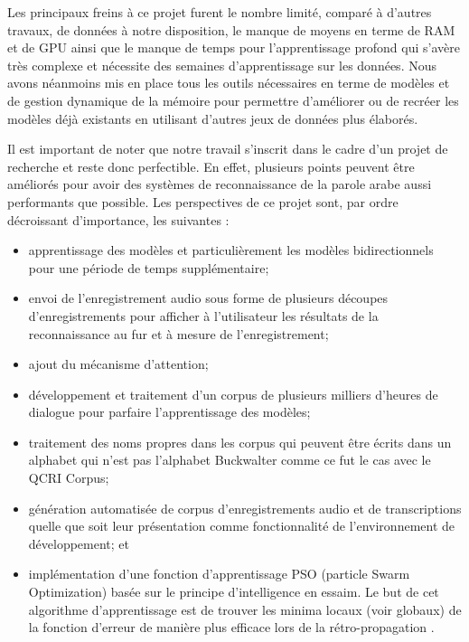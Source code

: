 
Les principaux freins à ce projet furent le nombre limité, comparé à d'autres travaux, de données à notre disposition, le manque de moyens en terme de RAM et de GPU ainsi que le manque de temps pour l'apprentissage profond qui s'avère très complexe et nécessite des semaines d'apprentissage sur les données. Nous avons néanmoins mis en place tous les outils nécessaires en terme de modèles et de gestion dynamique de la mémoire pour permettre d'améliorer ou de recréer les modèles déjà existants en utilisant d'autres jeux de données plus élaborés. 

Il est important de noter que notre travail s'inscrit dans le cadre d'un projet de recherche et reste donc perfectible. En effet, plusieurs points peuvent être améliorés pour avoir des systèmes de reconnaissance de la parole arabe aussi performants que possible. Les perspectives de ce projet sont, par ordre décroissant d'importance, les suivantes : 
\begin{itemize}
    \item apprentissage des modèles et particulièrement les modèles bidirectionnels pour une période de temps supplémentaire;
    \item envoi de l'enregistrement audio sous forme de plusieurs découpes d'enregistrements pour afficher à l'utilisateur les résultats de la reconnaissance au fur et à mesure de l'enregistrement;
    \item ajout du mécanisme d'attention;
    \item développement et traitement d'un corpus de plusieurs milliers d'heures de dialogue pour parfaire l'apprentissage des modèles;
    \item traitement des noms propres dans les corpus qui peuvent être écrits dans un alphabet qui n'est pas l'alphabet Buckwalter comme ce fut le cas avec le QCRI Corpus; 
    \item génération automatisée de corpus d'enregistrements audio et de transcriptions quelle que soit leur présentation comme fonctionnalité de l'environnement de développement; et
    \item implémentation d'une fonction d'apprentissage PSO (particle Swarm Optimization) basée sur le principe d'intelligence en essaim. Le but de cet algorithme d'apprentissage est de trouver les minima locaux (voir globaux) de la fonction d'erreur de manière plus efficace lors de la rétro-propagation \cite{pso}.\\
\end{itemize}

